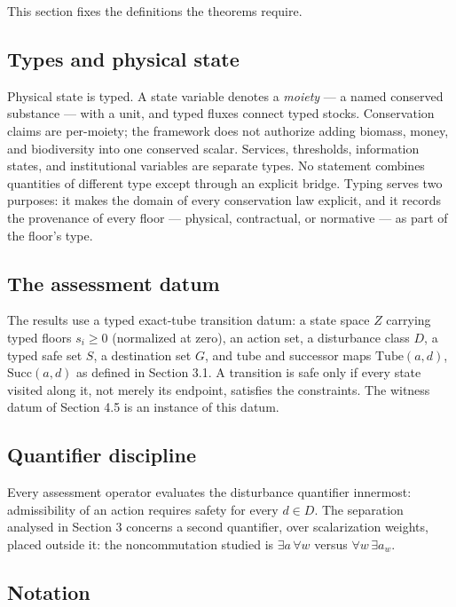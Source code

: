 \documentclass[3p,11pt]{elsarticle}
\begin{document}
This section fixes the definitions the theorems require.

\subsection{Types and physical
state}\label{types-and-physical-state}

Physical state is typed. A state variable denotes a \emph{moiety} --- a
named conserved substance --- with a unit, and typed fluxes connect
typed stocks. Conservation claims are per-moiety; the framework does not
authorize adding biomass, money, and biodiversity into one conserved
scalar. Services, thresholds, information states, and institutional
variables are separate types. No statement combines quantities of different type except through an explicit bridge. Typing serves two purposes: it makes the domain of every
conservation law explicit, and it records the provenance of every floor
--- physical, contractual, or normative --- as part of the floor's type.

\subsection{The assessment datum}\label{the-assessment-datum}

The results use a typed exact-tube transition datum: a state space \(Z\) carrying typed floors \(s_i \ge 0\) (normalized at zero), an action set, a disturbance class \(D\), a typed safe set \(S\), a destination set \(G\), and tube and successor maps \(\mathrm{Tube}(a,d)\), \(\mathrm{Succ}(a,d)\) as defined in Section 3.1. A transition is safe only if every state visited along it, not merely its endpoint, satisfies the constraints. The witness datum of Section 4.5 is an instance of this datum.

\subsection{Quantifier discipline}\label{quantifier-discipline}

Every assessment operator evaluates the disturbance quantifier innermost: admissibility of an action requires safety for every \(d \in D\). The separation analysed in Section 3 concerns a second quantifier, over scalarization weights, placed outside it: the noncommutation studied is \(\exists a\, \forall w\) versus \(\forall w\, \exists a_w\).

\subsection{Notation}\label{notation}
\end{document}
